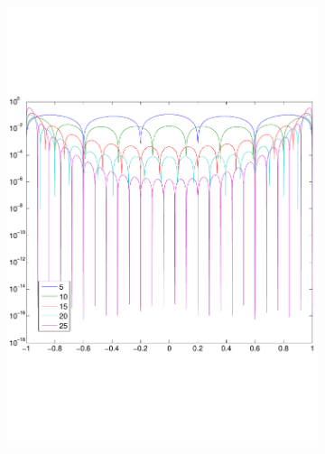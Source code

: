 \documentclass[a4paper, 12pt, titlepage]{report}
\begin{document}
\begin{figure}
 \begin{subfigure}{0.5\textwidth}
 \centering
 \includegraphics[width=\textwidth]{errorExp1.png}
 \end{subfigure}
 \begin{subfigure}{0.5\textwidth}
 \centering

\end{subfigure}
\end{figure}
\end{document}
